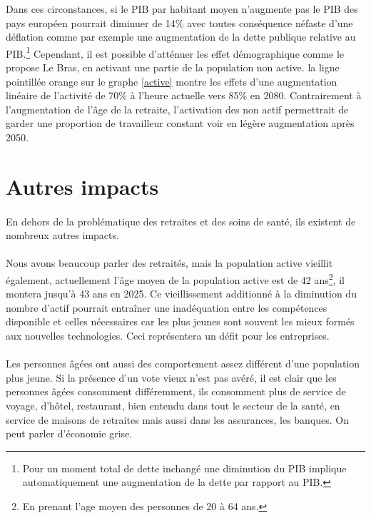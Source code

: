 Dans ces circonstances, si le PIB par habitant moyen n’augmente pas le PIB des pays européen pourrait diminuer de 14\% avec toutes conséquence néfaste d’une déflation comme par exemple une augmentation de la dette publique relative au PIB.\footnote{Pour un moment total de dette inchangé une diminution du PIB implique automatiquement une augmentation de la dette par rapport au PIB.} Cependant, il est possible d’atténuer les effet démographique comme le propose Le Bras, en activant une partie de la population non active\citep[pp.36]{heran}. la ligne pointillée orange sur le graphe \ref{active} montre les effets d’une augmentation linéaire de l’activité de 70\% à l’heure actuelle\citep{eurostat_emploi} vers 85\% en 2080. Contrairement à l’augmentation de l’âge de la retraite, l’activation des non actif permettrait de garder une proportion de travailleur constant voir en légère augmentation après 2050. 

\section{Autres impacts}
\paragraph{}En dehors de la problématique des retraites et des soins de santé, ils existent de nombreux autres impacts. 

\paragraph{}Nous avons beaucoup parler des retraités, mais la population active vieillit également, actuellement l’âge moyen de la population active est de 42 ans\footnote{ En prenant l’age moyen des personnes de 20 à 64 ans.\citep{eurostat_europop13}}, il montera jusqu’à 43 ans en 2025. Ce vieillissement additionné à la diminution du nombre d’actif pourrait entraîner une inadéquation entre les compétences disponible et celles nécessaires\citep[pp.10]{thesis} car les plus jeunes sont souvent les mieux formés aux nouvelles technologies. Ceci représentera un défit pour les entreprises. 

\paragraph{}Les personnes âgées ont aussi des comportement assez différent d’une population plus jeune. Si la présence d’un vote vieux n’est pas avéré\citep[pp.10]{heran}, il est clair que les personnes âgées consomment différemment, ils consomment plus de service de voyage, d’hôtel, restaurant, bien entendu dans tout le secteur de la santé,  en service de maisons de retraites mais aussi dans les assurances, les banques. On peut parler d’économie grise\citep[pp.11]{thesis}. 

